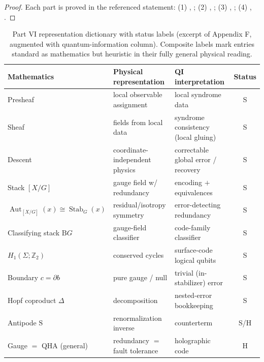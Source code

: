 \documentclass[12pt]{article}
\theoremstyle{definition}
\theoremstyle{remark}
\newcommand{\Aut}{\operatorname{Aut}}
\newcommand{\Stab}{\operatorname{Stab}}
\newcommand{\quot}[2]{[#1/#2]}
\newcommand{\ZZ}{\mathbb{Z}}
\newcommand{\antipode}{\mathrm{S}}
\newcommand{\cop}{\Delta}
\newcommand{\Ss}{\textsf{S}}
\newcommand{\Hh}{\textsf{H}}
\begin{document}
\begin{proof}
Each part is proved in the referenced statement: (1) ,
; (2) , ; (3)
, ; (4) ,
.
\end{proof}

\begin{table}[t]
\centering
\renewcommand{\arraystretch}{1.25}
\begin{tabular}{@{}>{\raggedright\arraybackslash}p{4.4cm}%
                  >{\raggedright\arraybackslash}p{4.4cm}%
                  >{\raggedright\arraybackslash}p{3.3cm}c@{}}
\hline
\textbf{Mathematics} & \textbf{Physical representation} & \textbf{QI interpretation} &
\textbf{Status}\\
\hline
Presheaf & local observable assignment & local syndrome data & \Ss\\
Sheaf & fields from local data & syndrome consistency (local gluing) & \Ss\\
Descent & coordinate-independent physics & correctable global error / recovery & \Ss\\
Stack $\quot{X}{G}$ & gauge field w/ redundancy & encoding $+$ equivalences & \Ss\\
$\Aut_{\quot{X}{G}}(x)\!\cong\!\Stab_G(x)$ & residual/isotropy symmetry & error-detecting
redundancy & \Ss\\
Classifying stack $\mathrm{B}G$ & gauge-field classifier & code-family classifier & \Ss\\
$H_1(\Sigma;\ZZ_2)$ & conserved cycles & surface-code logical qubits & \Ss\\
Boundary $c=\partial b$ & pure gauge / null & trivial (in-stabilizer) error & \Ss\\
Hopf coproduct $\cop$ & decomposition & nested-error bookkeeping & \Ss\\
Antipode $\antipode$ & renormalization inverse & counterterm & \Ss/\Hh\\
Gauge $=$ QHA (general) & redundancy $=$ fault tolerance & holographic code & \Hh\\
\hline
\end{tabular}
\caption{Part VI representation dictionary with status labels (excerpt of Appendix F,
augmented with quantum-information column). Composite labels mark entries standard as
mathematics but heuristic in their fully general physical reading.}
\label{tab:dictionary}
\end{table}
\end{document}
